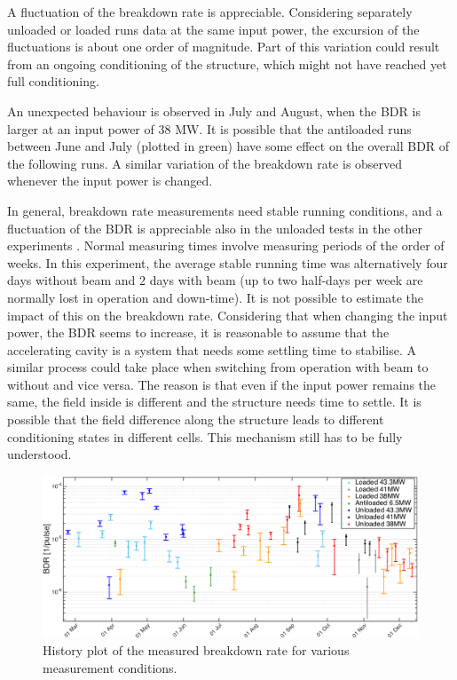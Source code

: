A fluctuation of the breakdown rate is appreciable. Considering separately unloaded or loaded runs data at the same input power, the excursion of the fluctuations is about one order of magnitude. Part of this variation could result from an ongoing conditioning of the structure, which might not have reached yet full conditioning.

An unexpected behaviour is observed in July and August, when the BDR is larger at an input power of 38 MW. It is possible that the antiloaded runs between June and July (plotted in green) have some effect on the overall BDR of the following runs. A similar variation of the breakdown rate is observed whenever the input power is changed.

In general, breakdown rate measurements need stable running conditions, and a fluctuation of the BDR is appreciable also in the unloaded tests in the other experiments \cite{Degiovanni:1742280}. Normal measuring times involve measuring periods of the order of weeks. In this experiment, the average stable running time was alternatively four days without beam and 2 days with beam (up to two half-days per week are normally lost in operation and down-time). It is not possible to estimate the impact of this on the breakdown rate. Considering that when changing the input power, the BDR seems to increase, it is reasonable to assume that the accelerating cavity is a system that needs some settling time to stabilise. A similar process could take place when switching from operation with beam to without and vice versa. The reason is that even if the input power remains the same, the field inside is different and the structure needs time to settle. It is possible that the field difference along the structure leads to different conditioning states in different cells. This mechanism still has to be fully understood.


\begin{landscape}

\begin{figure}[p]
\centering 
\includegraphics[scale=0.61]{pictures/bdr_hist_2.png}
\caption{History plot of the measured breakdown rate for various measurement conditions.}
\label{BDR_history}
\end{figure}
 
\end{landscape}


